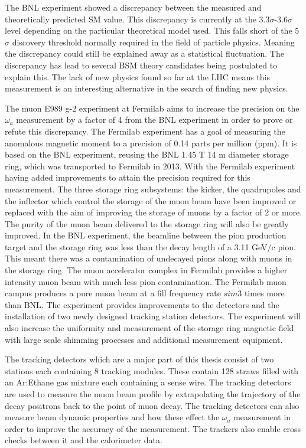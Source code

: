 The BNL experiment showed a discrepancy between the measured and theoretically predicted SM value. This discrepancy is currently at the 3.3$\sigma$-3.6$\sigma$ level depending on the particular theoretical model used. This falls short of the 5$\sigma$ discovery threshold normally required in the field of particle physics. Meaning the discrepancy could still be explained away as a statistical fluctuation. The discrepancy has lead to several BSM theory candidates being postulated to explain this. The lack of new physics found so far at the LHC means this measurement is an interesting alternative in the search of finding new physics.

The muon E989 g-2 experiment at Fermilab aims to increase the precision on the $\omega_{a}$ measurement by a factor of 4 from the BNL experiment in order to prove or refute this discrepancy. The Fermilab experiment has a goal of measuring the anomalous magnetic moment to a precision of 0.14 parts per million (ppm). It is based on the BNL experiment, reusing the BNL 1.45 T 14 m diameter storage ring, which was transported to Fermilab in 2013. With the Fermilab experiment having added improvements to attain the precision required for this measurement. The three storage ring subsystems: the kicker, the quadrupoles and the inflector which control the storage of the muon beam have been improved or replaced with the aim of improving the storage of muons by a factor of 2 or more. The purity of the muon beam delivered to the storage ring will also be greatly improved. In the BNL experiment, the beamline between the pion production target and the storage ring was less than the decay length of a 3.11 GeV/c pion. This meant there was a contamination of undecayed pions along with muons in the storage ring. The muon accelerator complex in Fermilab provides a higher intensity muon beam with much less pion contamination. The Fermilab muon campus produces a pure muon beam at a fill frequency rate $sim{3}$ times more than BNL. The experiment provides improvements to the detectors and the installation of two newly designed tracking station detectors. The experiment will also increase the uniformity and measurement of the storage ring magnetic field with large scale shimming processes and additional measurement equipment.

The tracking detectors which are a major part of this thesis consist of two stations each containing 8 tracking modules. These contain 128 straws filled with an Ar:Ethane gas mixture each containing a sense wire. The tracking detectors are used to measure the muon beam profile by extrapolating the trajectory of the decay positrons back to the point of muon decay. The tracking detectors can also measure beam dynamic properties and how these effect the $\omega_{a}$ measurement in order to improve the accuracy of the measurement. The trackers also enable cross checks between it and the calorimeter data.

